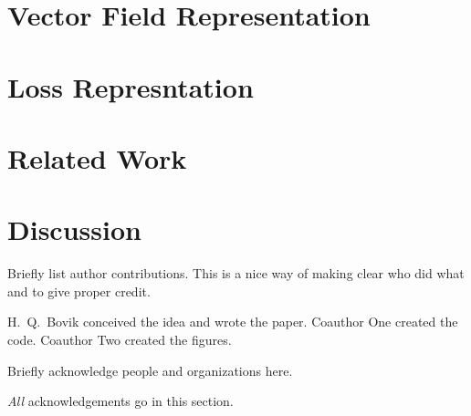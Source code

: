 \documentclass{uai2022} %
\begin{document}
\section{Vector Field Representation}
\section{Loss Represntation}

\section{Related Work}
\section{Discussion}


\begin{contributions} %
    Briefly list author contributions.
    This is a nice way of making clear who did what and to give proper credit.

    H.~Q.~Bovik conceived the idea and wrote the paper.
    Coauthor One created the code.
    Coauthor Two created the figures.
\end{contributions}

\begin{acknowledgements} %
    Briefly acknowledge people and organizations here.

    \emph{All} acknowledgements go in this section.
\end{acknowledgements}

% 
\printbibliography

\appendix
\providecommand{\upGamma}{\Gamma}
\providecommand{\uppi}{\pi}
\end{document}
